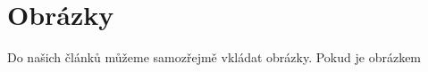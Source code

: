 \documentclass[11pt,a4paper]{article}
\begin{document}
\section{Obrázky}

Do našich článků můžeme samozřejmě vkládat obrázky. Pokud je obrázkem
\end{document}
